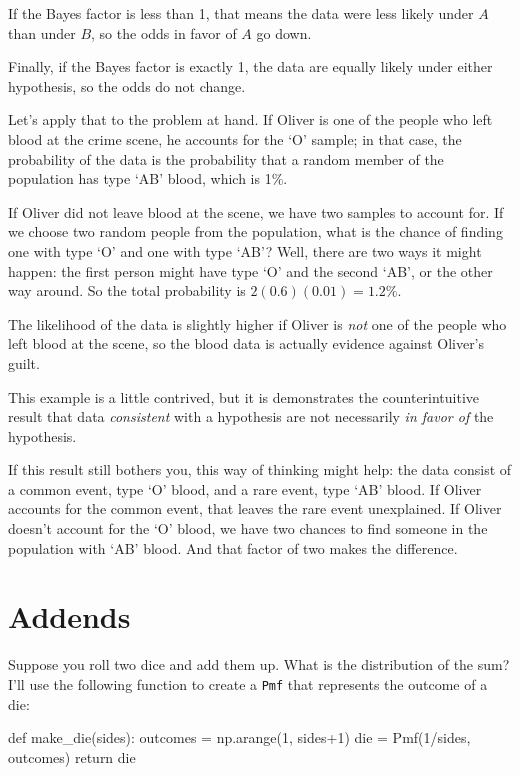 \documentclass[12pt]{book}
\theoremstyle{exercise}
\newcommand{\py}[1]{{\tt #1}}%
\begin{document}
If the Bayes factor is less than 1, that means the data were
less likely under $A$ than under $B$, so the odds in
favor of $A$ go down.

Finally, if the Bayes factor is exactly 1, the data are equally
likely under either hypothesis, so the odds do not change.

Let's apply that to the problem at hand.  If Oliver is
one of the people who left blood at the crime scene, he
accounts for the `O' sample; in that case, the probability of the data
is the probability that a random member of the population
has type `AB' blood, which is 1\%.

If Oliver did not leave blood at the scene, we have two
samples to account for.  If we choose two random people from
the population, what is the chance of finding one with type `O'
and one with type `AB'?  Well, there are two ways it might happen:
the first person might have type `O' and the second
`AB', or the other way around.  So the total probability is
$2 (0.6) (0.01) = 1.2\%$.

The likelihood of the data is slightly higher if Oliver is
{\it not} one of the people who left blood at the scene, so
the blood data is actually evidence against Oliver's guilt.


This example is a little contrived, but it is demonstrates
the counterintuitive result that data {\it consistent} with
a hypothesis are not necessarily {\it in favor of}
the hypothesis.

If this result still bothers you, this way of thinking might help: the data consist of a common event, type `O' blood, and a rare event, type `AB' blood.
If Oliver accounts for the common event, that leaves the rare
event unexplained.  If Oliver doesn't account for the
`O' blood, we have two chances to find someone in the
population with `AB' blood.  And that factor of two makes
the difference.


\section{Addends}
\label{addends}

Suppose you roll two dice and add them up.  What is the distribution of the sum?
I'll use the following function to create a \py{Pmf} that represents the outcome of a die:

\begin{code}
def make_die(sides):
    outcomes = np.arange(1, sides+1)
    die = Pmf(1/sides, outcomes)
    return die
\end{code}
\end{document}
